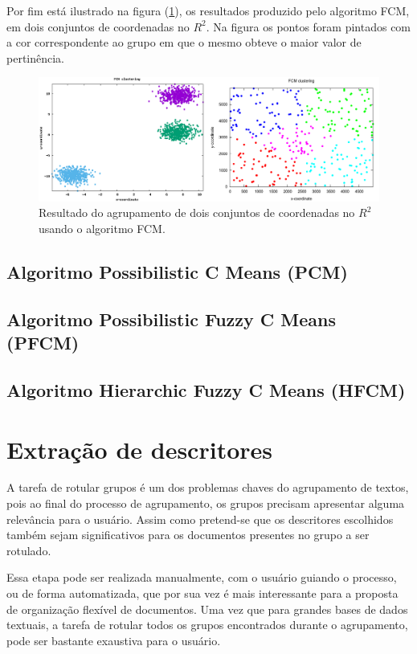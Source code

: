 Por fim está ilustrado na figura (\ref{fig:samples_fcm}), os resultados produzido pelo algoritmo FCM,
em dois conjuntos de coordenadas no $R^2$. Na figura os pontos foram pintados com a cor 
correspondente ao grupo em que o mesmo obteve o maior valor de pertinência.

\begin{figure}[!htp]
  \centering
  \includegraphics[width=0.8\columnwidth]{assets/samples_fcm.png}
  \caption{Resultado do agrupamento de dois conjuntos de coordenadas no $R^2$ usando o algoritmo 
  FCM\protect\footnotemark.}
  \label{fig:samples_fcm}
\end{figure}


\subsection{Algoritmo Possibilistic C Means (PCM)}
\subsection{Algoritmo Possibilistic Fuzzy C Means (PFCM)}
\subsection{Algoritmo Hierarchic Fuzzy C Means (HFCM)}

\section{Extração de descritores}

A tarefa de rotular grupos é um dos problemas chaves do agrupamento de textos, 
pois ao final do processo de agrupamento, os grupos precisam apresentar alguma relevância para 
o usuário\cite{Zhang2008}. Assim como pretend-se que os descritores escolhidos também sejam 
significativos para os documentos presentes no grupo a ser rotulado. 

Essa etapa pode ser realizada manualmente, com o usuário guiando o processo, ou de forma 
automatizada, que por sua vez é mais interessante para a proposta de organização flexível de 
documentos. Uma vez que para grandes bases de dados textuais, a tarefa de rotular todos os grupos
encontrados durante o agrupamento, pode ser bastante exaustiva para o usuário.

